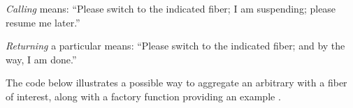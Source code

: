 \emph{Calling} \resume means: ``Please switch to the indicated fiber; I
am suspending; please resume me later.''

\emph{Returning} a particular \fiber means: ``Please switch to the indicated
fiber; and by the way, I am done.''

The code below illustrates a possible way to aggregate an arbitrary \cancelfn
with a fiber of interest, along with a factory function providing an
example \cancelfn.




